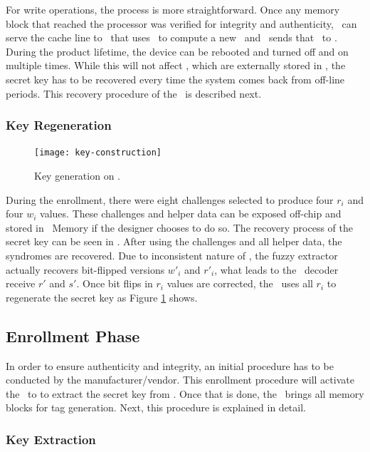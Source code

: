 For write operations, the process is more straightforward. Once any memory block that reached the processor was verified for integrity and authenticity, \handler~can serve the cache line to \seceng~that uses \ptaggen~to compute a new \ptag~and \pmmu~sends that \ptag~to \ptagmem.  During the product lifetime, the device can be rebooted and turned off and on multiple times. While this will not affect \ptags, which are externally stored in \ptagmem, the secret key has to be recovered every time the system comes back from off-line periods. This recovery procedure of the \fuzzy~is described next.

\subsubsection{Key Regeneration}
\label{subsubsec:Key-Regenation}
\begin{figure}[!t]
    \centering
    \texttt{[image: key-construction]}
    \caption{Key generation on \cshia.}
    \label{fig:key-construction}
\end{figure}

During the enrollment, there were eight challenges selected to produce four $r_i$ and four $w_i$ values. These challenges and helper data can be exposed off-chip and stored in \ptag~Memory if the designer chooses to do so. The recovery process of the secret key can be seen in \fregen. After using the challenges and all helper data, the syndromes are recovered. Due to inconsistent nature of \pufs, the fuzzy extractor actually recovers bit-flipped versions $w'_i$ and $r'_i$, what leads to the \bch~decoder receive $r'$ and $s'$. Once bit flips in $r_i$ values are corrected, the \fe~uses all $r_i$ to regenerate the secret key as Figure \ref{fig:key-construction} shows.

\subsection{Enrollment Phase}
\label{subsec:Enrollment-Phase}

In order to ensure authenticity and integrity, an initial procedure has to be conducted by the manufacturer\slash{}vendor. This enrollment procedure will activate the \fuzzy~to to extract the secret key from \pufs. Once that is done, the \handler~brings all memory blocks for tag generation. Next, this procedure is explained in detail.

\subsubsection{Key Extraction}
\label{subsubsec:Key-Extraction}

